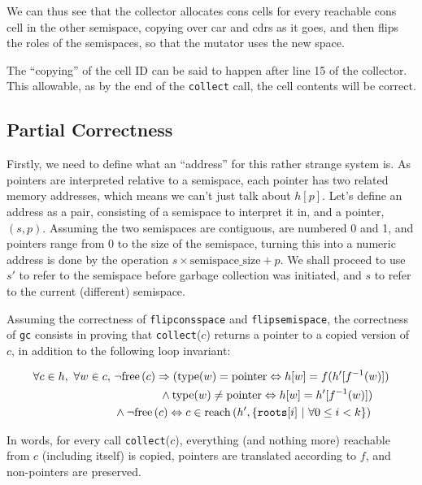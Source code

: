 We can thus see that the collector allocates cons cells for every
reachable cons cell in the other semispace, copying over car and cdrs
as it goes, and then flips the roles of the semispaces, so that the
mutator uses the new space.

The ``copying'' of the cell ID can be said to happen after line 15 of
the collector. This allowable, as by the end of the \texttt{collect}
call, the cell contents will be correct.

\subsection{Partial Correctness}
\label{sec:copying-example-partial}

Firstly, we need to define what an ``address'' for this rather strange
system is. As pointers are interpreted relative to a semispace, each
pointer has two related memory addresses, which means we can't just
talk about $h[p]$. Let's define an address as a pair, consisting of a
semispace to interpret it in, and a pointer, $(s, p)$. Assuming the
two semispaces are contiguous, are numbered 0 and 1, and pointers
range from 0 to the size of the semispace, turning this into a numeric
address is done by the operation $s \times \mathrm{semispace\_size} +
p$. We shall proceed to use $s'$ to refer to the semispace before
garbage collection was initiated, and $s$ to refer to the current
(different) semispace.

Assuming the correctness of \texttt{flipconsspace} and
\texttt{flipsemispace}, the correctness of \texttt{gc} consists in
proving that \texttt{collect}($c$) returns a pointer to a copied
version of $c$, in addition to the following loop invariant:

\begin{align*}
  \forall c \in h,\ \forall w \in c,\ &\lnot\mathrm{free}\left(c\right) \Rightarrow
  (\mathrm{type}(w) = \mathrm{pointer} \Leftrightarrow h[w] = f(h'[f^{-1}(w)])\\
  &\quad\quad\quad\quad \land \mathrm{type}(w) \neq \mathrm{pointer}
  \Leftrightarrow h[w] = h'[f^{-1}(w)])\\
  &\land \lnot\mathrm{free}\left(c\right) \Leftrightarrow c \in
  \mathrm{reach}\left(h', \{\mathtt{roots}[i]~|~\forall 0 \leq i < k\}\right)
\end{align*}

In words, for every call \texttt{collect}($c$), everything (and
nothing more) reachable from $c$ (including itself) is copied,
pointers are translated according to $f$, and non-pointers are
preserved.

